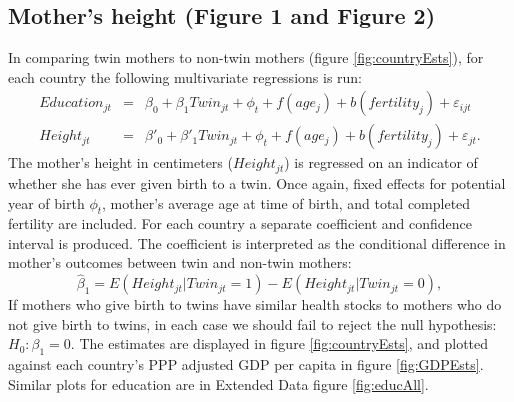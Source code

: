 \documentclass{nature}
\begin{document}
\begin{linenumbers}
\subsection{Mother's height (Figure 1 and Figure 2)}
In comparing twin mothers to non-twin mothers (figure \ref{fig:countryEsts}), for each country the following multivariate regressions is run:
\begin{eqnarray}
  Education_{jt}&=&\beta_0 + \beta_1 Twin_{jt} + \phi_t + f(age_j) + b(fertility_j) + \varepsilon_{ijt} \\
  Height_{jt}&=&\beta'_0 + \beta'_1 Twin_{jt} + \phi_t + f(age_j) + b(fertility_j) + \varepsilon_{jt}.
\end{eqnarray}
The mother's height in centimeters ($Height_{jt}$) is regressed on an indicator of whether she has ever given birth to a twin.  Once again, fixed effects for potential year of birth $\phi_t$, mother's average age at time of birth, and total completed fertility are included.  For each country a separate coefficient and confidence interval is produced.  The coefficient is interpreted as the conditional difference in mother's outcomes between twin and non-twin mothers:
\[
\hat\beta_1 = E(Height_{jt}| Twin_{jt}=1) - E(Height_{jt}| Twin_{jt}=0),
\]
 If mothers who give birth to twins have similar health stocks to mothers who do not give birth to twins, in each case we should fail to reject the null hypothesis: $H_0: \beta_1=0$.  The estimates are displayed in figure \ref{fig:countryEsts}, and plotted against each country's PPP adjusted GDP per capita in figure \ref{fig:GDPEsts}.  Similar plots for education are in Extended Data figure \ref{fig:educAll}.%


\end{linenumbers}
\end{document}
